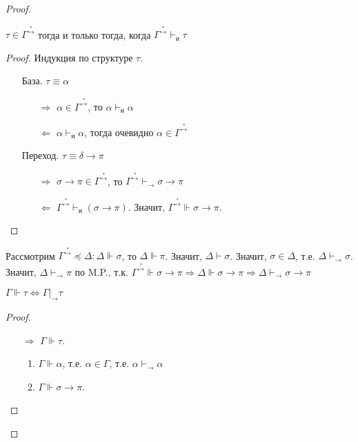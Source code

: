 \begin{proof}
    \begin{statement}
        \(\tau \in \Gamma^{\stackrel{*}{\to}}\) тогда и только тогда, когда \(\Gamma^{\stackrel{*}{\to}} \vdash_{\mathrm{и}} \tau\)
    \end{statement}
    \begin{proof}
        Индукция по структуре \(\tau\).
        \begin{itemize}
            \item [База.] \(\tau \equiv \alpha\)
                  \begin{itemize}
                      \item [\( \Rightarrow \)] \(\alpha \in \Gamma^{\stackrel{*}{\to}}\), то \(\alpha \vdash_{\mathrm{и}} \alpha\)
                      \item [\( \Leftarrow \)] \(\alpha \vdash_{\mathrm{и}} \alpha\), тогда очевидно \(\alpha \in \Gamma^{\stackrel{*}{\to}}\)
                  \end{itemize}
            \item [Переход.] \(\tau \equiv \delta \to \pi\)
                  \begin{itemize}
                      \item [\( \Rightarrow \)] \(\sigma \to \pi \in \Gamma^{\stackrel{*}{\to}}\), то \(\Gamma^{\stackrel{*}{\to}} \vdash_{\to} \sigma \to \pi\)
                      \item [\( \Leftarrow \)] \(\Gamma^{\stackrel{*}{\to}} \vdash_{\mathrm{и}} (\sigma \to \pi)\). Значит, \(\Gamma^{\stackrel{*}{\to}} \Vdash \sigma \to \pi\).
                  \end{itemize}
        \end{itemize}
    \end{proof}

    Рассмотрим \(\Gamma^{\stackrel{*}{\to}} \preceq \Delta : \Delta \Vdash \sigma\), то \(\Delta \Vdash \pi\). Значит, \(\Delta \vdash \sigma\). Значит, \(\sigma \in \Delta\), т.е. \(\Delta \vdash_{\to} \sigma\). Значит, \(\Delta \vdash_{\to} \pi\) по M.P., т.к. \(\Gamma^{\stackrel{*}{\to}} \Vdash \sigma \to \pi \Rightarrow \Delta \Vdash \sigma \to \pi \Rightarrow \Delta \vdash_{\to} \sigma \to \pi\)

    \begin{statement}
        \(\Gamma \Vdash \tau \Leftrightarrow \Gamma |_{\to} \tau\)
    \end{statement}
    \begin{proof}\itemfix
        \begin{itemize}
            \item [\( \Rightarrow \)] \(\Gamma \Vdash \tau\).
                  \begin{enumerate}
                      \item \(\Gamma \Vdash \alpha\), т.е. \(\alpha \in \Gamma\), т.е. \(\alpha \vdash_{ \to } \alpha\)
                      \item \(\Gamma \Vdash \sigma \to \pi\).


\end{enumerate}
\end{itemize}
\end{proof}
\end{proof}
